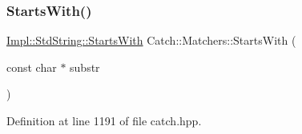 \subsubsection{\texorpdfstring{Starts\+With()}{StartsWith()}\hspace{0.1cm}{\footnotesize\ttfamily [2/2]}}
{\footnotesize\ttfamily \hyperlink{struct_catch_1_1_matchers_1_1_impl_1_1_std_string_1_1_starts_with}{Impl\+::\+Std\+String\+::\+Starts\+With} Catch\+::\+Matchers\+::\+Starts\+With (\begin{DoxyParamCaption}\item[{const char $\ast$}]{substr }\end{DoxyParamCaption})\hspace{0.3cm}{\ttfamily [inline]}}



Definition at line 1191 of file catch.\+hpp.

